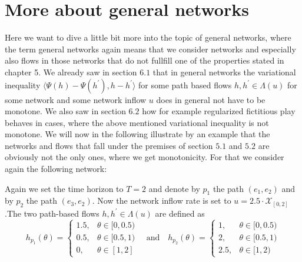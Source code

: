 \documentclass[reqno,openany]{amsbook}
\theoremstyle{definition}
\theoremstyle{plain}
\begin{document}
\section{More about general networks}
Here we want to dive a little bit more into the topic of general networks, where the term general networks again means that we consider networks and especially also flows in those networks that do not fullfill one of the properties stated in chapter 5. We already saw in section $6.1$ that in general networks the variational inequality $\langle \Psi(h) - \Psi(h^{\prime}), h - h^{\prime} \rangle$ for some path based flows $h, h^{\prime} \in \Lambda(u)$ for some network and some network inflow $u$ does in general not have to be monotone. We also saw in section $6.2$ how for example regularized fictitious play behaves in cases, where the above mentioned variational inequality is not monotone. We will now in the following illustrate by an example that the networks and flows that fall under the premises of section $5.1$ and $5.2$ are obviously not the only ones, where we get monotonicity. For that we consider again the following network:
\begin{figure}[H]
\end{figure}
Again we set the time horizon to $T = 2$ and denote by $p_1$ the path $(e_1, e_2)$ and by $p_2$ the path $(e_3, e_2)$. Now the network inflow rate is set to $u = 2.5 \cdot \mathcal{X}_{[0, 2]}$.The two path-based flows $h, h^{\prime} \in \Lambda(u)$ are defined as  
\[ h_{p_1}(\theta) = \begin{cases} 1.5,& \theta \in [0, 0.5) \\ 0.5,& \theta \in [0.5, 1) \\ 0,& \theta \in [1, 2] \end{cases} \quad \text{and} \quad h_{p_2}(\theta) = \begin{cases} 1,& \theta \in [0, 0.5) \\ 2,& \theta \in [0.5, 1) \\ 2.5,& \theta \in [1, 2) \end{cases} \]
\end{document}
